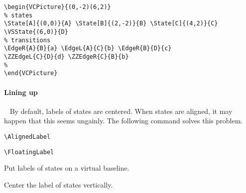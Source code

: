 \documentclass[11pt,twoside]{article}
\newlength{\ColoText}%
\newlength{\ColoFigu}%
\newlength{\parindenttemp} %
\newcommand{\noi}{\noindent}
\newcommand{\ee}{\text{\qquad}}               %
\newlength{\jsIndent}%
\newlength{\ColSource}%
\newlength{\ColFigur}%
\begin{document}
\noi 
\hspace*{-\jsIndent}
\begin{minipage}[c]{\ColFigur}%
\par\vspace*{0mm}%
\begin{center}
%
\end{center}
\end{minipage}%
\hspace*{1.2em}%
\begin{minipage}[c]{\ColSource}
\setlength{\parindent}{\parindenttemp}%
\par\vspace*{0mm}%
\footnotesize
\begin{verbatim}
\begin{VCPicture}{(0,-2)(6,2)}
% states
\State[A]{(0,0)}{A} \State[B]{(2,-2)}{B} \State[C]{(4,2)}{C}
\VSState{(6,0)}{D}
% transitions 
\EdgeR{A}{B}{a} \EdgeL{A}{C}{b} \EdgeR{B}{D}{c} 
\ZZEdgeL{C}{D}{d} \ZZEdgeR{C}{B}{b}
%
\end{VCPicture}
\end{verbatim}
\normalsize
\end{minipage}%

\paragraph{Lining up}
~
By default, labels of states are centered. When states are aligned, it may happen
that this seems ungainly. The following command solves this problem.

\noi 
\hspace*{-\jsIndent}
\begin{minipage}[t]{\ColoText}
        \par\vspace*{0mm}%
        \footnotesize
\verb+\AlignedLabel+ \ee 
   
\medskip 
\verb+\FloatingLabel+ \ee 
   
\end{minipage}%
\hspace*{1.2em}%
\begin{minipage}[t]{\ColoFigu}%
\par\vspace*{0mm}%
Put labels of states on a virtual baseline.

\smallskip 

Center the label of states vertically.
\end{minipage}%
\end{document}
